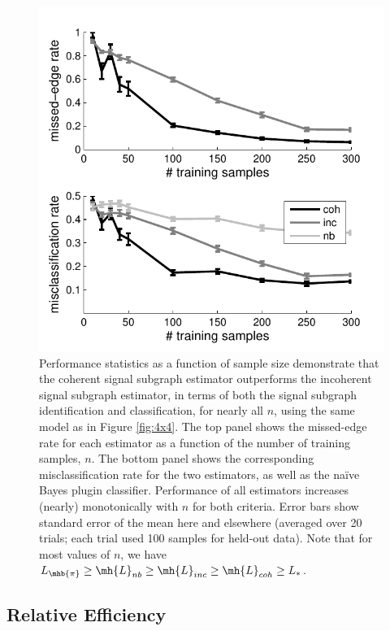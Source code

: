 \documentclass[10pt,journal,cspaper,compsoc]{IEEEtran}
\begin{document}
\begin{figure}[htbp]
	\centering
		\includegraphics[width=1.0\linewidth]{../figs/homo_V70_s20_p10_q30_Lhats.pdf}
	\caption{Performance statistics as a function of sample size demonstrate that the coherent signal subgraph estimator outperforms the incoherent signal subgraph estimator, in terms of both the signal subgraph identification and classification, for nearly all $n$, using the same model as in Figure \ref{fig:4x4}.  The top panel shows the missed-edge rate for each estimator as a function of the number of training samples, $n$.  The bottom panel shows the corresponding misclassification rate for the two estimators, as well as the na\"ive Bayes plugin classifier.  Performance of all estimators increases (nearly) monotonically with $n$ for both criteria.  Error bars show standard error of the mean here and elsewhere (averaged over 20 trials; each trial used 100 samples for held-out data). Note that for most values of $n$, we have $L_{\mhb{\pi}} \geq \mh{L}_{nb} \geq \mh{L}_{inc} \geq \mh{L}_{coh} \geq L_*$.}
	\label{fig:homo}
\end{figure}


\subsection{Relative Efficiency} %
\label{sub:relative_efficiencies}
\end{document}
